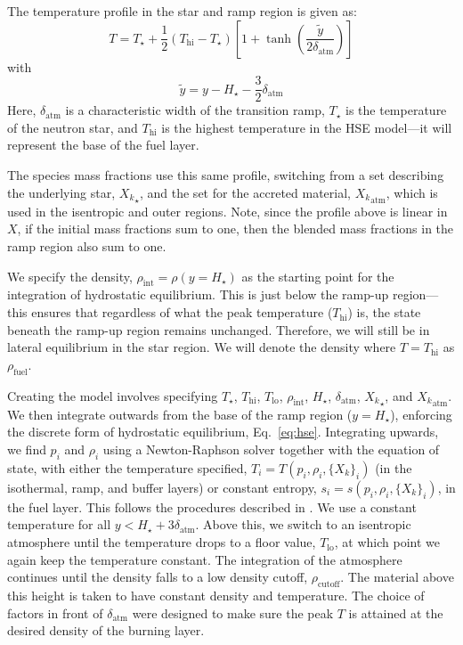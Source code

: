 \documentclass[preprint,times,tighten]{aastex63}
\begin{document}
The temperature profile in the star and ramp region is given as:
\begin{equation}
T = T_\star + \frac{1}{2} (T_\mathrm{hi} - T_\star) \left [ 1 + \tanh\left( \frac{\tilde{y}}{2 \delta_\mathrm{atm}} \right ) \right ]
\end{equation}
with
\begin{equation}
\tilde{y} = y - H_\star - \frac{3}{2} \delta_\mathrm{atm}
\end{equation}
Here, $\delta_\mathrm{atm}$ is a characteristic width of the
transition ramp, $T_\star$ is the temperature of the neutron star, and
$T_\mathrm{hi}$ is the highest temperature in the HSE model---it will
represent the base of the fuel layer.

The species mass fractions use this same profile, switching from a set
describing the underlying star, ${X_k}_\star$, and the set for the
accreted material, ${X_k}_\mathrm{atm}$, which is used in the
isentropic and outer regions.  Note, since the profile above is
linear in $X$, if the initial mass fractions sum to one, then the blended
mass fractions in the ramp region also sum to one.

We specify the density, $\rho_\mathrm{int} = \rho(y = H_\star)$ as the
starting point for the integration of hydrostatic equilibrium.  This
is just below the ramp-up region---this ensures that regardless of
what the peak temperature ($T_\mathrm{hi}$) is, the state beneath the
ramp-up region remains unchanged.  Therefore, we will still be in
lateral equilibrium in the star region.  We will denote the density
where $T = T_\mathrm{hi}$ as $\rho_\mathrm{fuel}$.


Creating the model involves specifying $T_\star$, $T_\mathrm{hi}$,
$T_\mathrm{lo}$, $\rho_\mathrm{int}$, $H_\star$,
$\delta_\mathrm{atm}$, ${X_k}_\star$, and ${X_k}_\mathrm{atm}$.  We
then integrate outwards from the base of the ramp region ($y =
H_\star$), enforcing the discrete form of hydrostatic equilibrium,
Eq.~\ref{eq:hse}.  Integrating upwards, we find $p_i$ and
$\rho_i$ using a Newton-Raphson solver together with the equation of state, with either the temperature
specified, $T_i = T(p_i, \rho_i, \{X_k\}_i)$ (in the isothermal, ramp,
and buffer layers) or constant entropy, $s_i = s(p_i, \rho_i,
\{X_k\}_i)$, in the fuel layer.  This follows the procedures described in \citet{ppm-hse}.  We
use a constant temperature for all $y < H_\star +
3\delta_\mathrm{atm}$.  Above this, we switch to an isentropic atmosphere until the
temperature drops to a floor value, $T_\mathrm{lo}$, at which point we
again keep the temperature constant.  The integration of the
atmosphere continues until the density falls to a low density cutoff,
$\rho_\mathrm{cutoff}$.  The material above this height is taken to
have constant density and temperature.
The choice of factors in front of $\delta_\mathrm{atm}$ were designed
to make sure the peak $T$ is attained at the desired density
of the burning layer.
\end{document}
